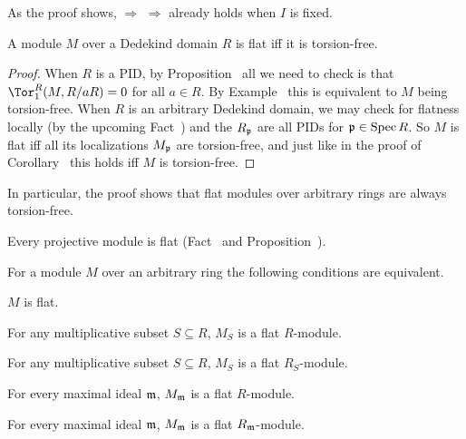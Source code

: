 \documentclass[a4paper,parskip=half,numbers=enddot, DIV=12]{scrreprt}
\begin{document}
\begin{rem*}
	As the proof shows,  $\Rightarrow$  $\Rightarrow$  already holds when $I$ is fixed.
\end{rem*}
\begin{cor}
	A module $M$ over a Dedekind domain $R$ is flat iff it is torsion-free.
\end{cor}
\begin{proof}
	When $R$ is a PID, by Proposition~ all we need to check is that $\Tor_1^R(M,R/aR)=0$ for all $a\in R$. By Example~ this is equivalent to $M$ being torsion-free. When $R$ is an arbitrary Dedekind domain, we may check for flatness locally (by the upcoming Fact~) and the $R_{\mathfrak{p}}$ are all PIDs for $\mathfrak{p}\in \operatorname{Spec} R$. So $M$ is flat iff all its localizations $M_{\mathfrak{p}}$ are torsion-free, and just like in the proof of Corollary~ this holds iff $M$ is torsion-free.
\end{proof}
\begin{rem*}
	In particular, the proof shows that flat modules over arbitrary rings are always torsion-free.
\end{rem*}
\begin{example}
	Every projective module is flat (Fact~ and Proposition~).
\end{example}
\begin{fact}
	For a module $M$ over an arbitrary ring the following conditions are equivalent.
	\begin{alphanumerate}
		\item $M$ is flat.
		\item For any multiplicative subset $S\subseteq R$, $M_S$ is a flat $R$-module.
		\item For any multiplicative subset $S\subseteq R$, $M_S$ is a flat $R_S$-module.
		\item For every maximal ideal $\mathfrak{m}$, $M_{\mathfrak{m}}$ is a flat $R$-module.
		\item For every maximal ideal $\mathfrak{m}$, $M_{\mathfrak{m}}$ is a flat $R_{\mathfrak{m}}$-module.
	\end{alphanumerate}
\end{fact}
\end{document}
